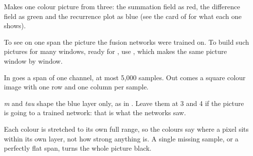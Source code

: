 Makes one colour picture from three: the summation field as red, the difference field as
green and the recurrence plot as blue (see the card of 
for what each one shows).

To see on one span the picture the fusion networks were trained on. To build such pictures
for many windows, ready for , use
, which makes the same picture window by window.

In goes a span of one channel, at most 5{,}000 samples. Out comes a square colour image with
one row and one column per sample.

\emph{m} and \emph{tau} shape the blue layer only, as in
. Leave them at 3 and 4 if the picture is going to a
trained network: that is what the networks saw.

Each colour is stretched to its own full range, so the colours say where a pixel sits within
its own layer, not how strong anything is. A single missing sample, or a perfectly flat
span, turns the whole picture black.
